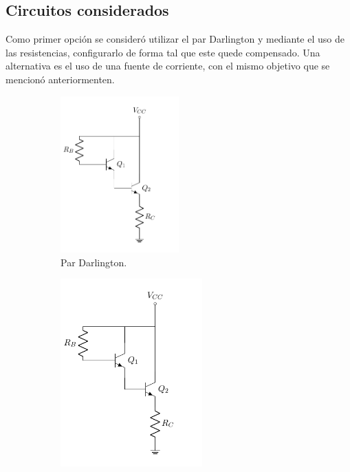 \subsection{Circuitos considerados}
Como primer opción se consideró utilizar el par Darlington y mediante el uso de las resistencias, configurarlo de forma tal que este quede compensado. Una alternativa es el uso de una fuente de corriente, con el mismo objetivo que se mencionó anteriormenten.
\begin{figure}[H]
\centering
\begin{subfigure}{.45\textwidth}
\centering
	\includegraphics[width=0.5\textwidth, page=1]{Imagenes/ParDarlington.pdf}
	\caption{Par Darlington.}
	\label{fig:pardar1}
\end{subfigure}
\begin{subfigure}{.4\textwidth}
\centering
	\includegraphics[width=0.6\textwidth, page=2]{Imagenes/ParDarlington.pdf}

\end{subfigure}
\end{figure}
